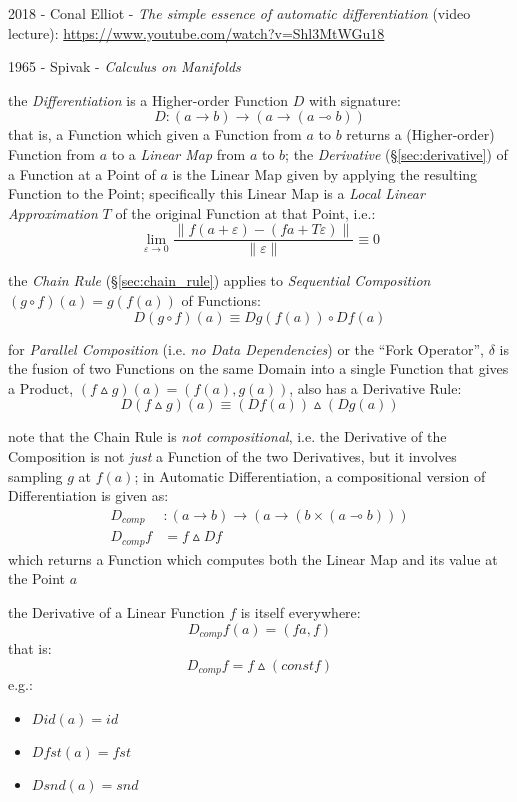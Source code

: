 \asterism

2018 - Conal Elliot - \emph{The simple essence of automatic differentiation}
(video lecture): \url{https://www.youtube.com/watch?v=Shl3MtWGu18}

1965 - Spivak - \emph{Calculus on Manifolds}

the \emph{Differentiation} is a Higher-order Function $D$ with signature:
\[
  D : (a \rightarrow b) \rightarrow (a \rightarrow (a \multimap b))
\]
that is, a Function which given a Function from $a$ to $b$ returns a
(Higher-order) Function from $a$ to a \emph{Linear Map} from $a$ to $b$; the
\emph{Derivative} (\S\ref{sec:derivative}) of a Function at a Point of $a$ is
the Linear Map given by applying the resulting Function to the Point;
specifically this Linear Map is a \emph{Local Linear Approximation} $T$ of the
original Function at that Point, i.e.:
\[
  \lim_{\varepsilon \rightarrow 0}
    \frac{\|f (a + \varepsilon) - (f a + T \varepsilon)\|}{\|\varepsilon\|}
    \equiv 0
\]

the \emph{Chain Rule} (\S\ref{sec:chain_rule}) applies to \emph{Sequential
  Composition} $(g \circ f)(a) = g (f (a))$ of Functions:
\[
  D(g \circ f) (a) \equiv D g (f(a)) \circ D f (a)
\]

for \emph{Parallel Composition} (i.e. \emph{no Data Dependencies}) or the ``Fork
Operator'', $\delta$ is the fusion of two Functions on the same Domain into a
single Function that gives a Product, $(f \vartriangle g)(a) = (f(a), g(a))$,
also has a Derivative Rule:
\[
  D(f \vartriangle g)(a) \equiv (D f (a)) \vartriangle (D g (a))
\]

note that the Chain Rule is \emph{not compositional}, i.e. the Derivative of the
Composition is not \emph{just} a Function of the two Derivatives, but it
involves sampling $g$ at $f(a)$; in Automatic Differentiation, a compositional
version of Differentiation is given as:
\begin{align*}
  D_{comp}   & : (a \rightarrow b)
    \rightarrow (a \rightarrow (b \times (a \multimap b))) \\
  D_{comp} f & = f \vartriangle D f
\end{align*}
which returns a Function which computes both the Linear Map and its value at the
Point $a$

the Derivative of a Linear Function $f$ is itself everywhere:
\[
  D_{comp} f(a) = (f a, f)
\]
that is:
\[
  D_{comp} f = f \vartriangle (const f)
\]
e.g.:
\begin{itemize}
  \item $D id (a) = id$
  \item $D fst (a) = fst$
  \item $D snd (a) = snd$
\end{itemize}

